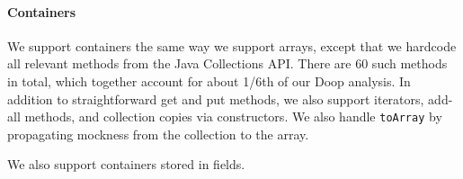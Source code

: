 \paragraph{Containers} We support containers the same way we support arrays, except that we hardcode all relevant methods from the Java Collections API. There are 60 such methods in total, which together account for about 1/6th of our Doop analysis. In addition to straightforward get and put methods, we also support iterators, add-all methods, and collection copies via constructors. We also handle {\tt toArray} by propagating mockness from the collection to the array.

We also support containers stored in fields.

